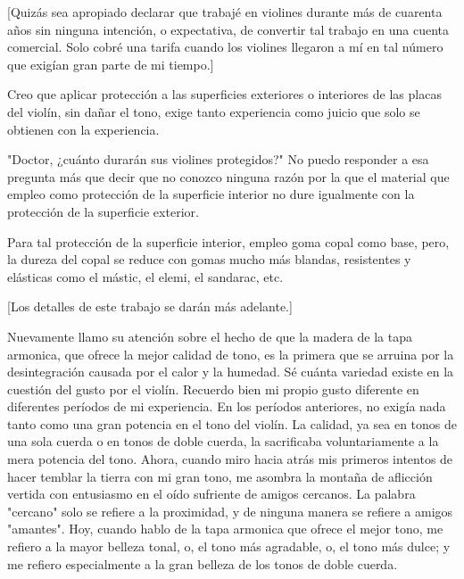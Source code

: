 \documentclass[12pt]{book}
\begin{document}
[Quizás sea apropiado declarar que trabajé en violines durante más de cuarenta años sin ninguna intención, o expectativa, de convertir tal trabajo en una cuenta comercial. Solo cobré una tarifa cuando los violines llegaron a mí en tal número que exigían gran parte de mi tiempo.]

Creo que aplicar protección a las superficies exteriores o interiores de las placas del violín, sin dañar el tono, exige tanto experiencia como juicio que solo se obtienen con la experiencia.

"Doctor, ¿cuánto durarán sus violines protegidos?" No puedo responder a esa pregunta más que decir que no conozco ninguna razón por la que el material que empleo como protección de la superficie interior no dure igualmente con la protección de la superficie exterior.

Para tal protección de la superficie interior, empleo goma copal como base, pero, la dureza del copal se reduce con gomas mucho más blandas, resistentes y elásticas como el mástic, el elemi, el sandarac, etc.

[Los detalles de este trabajo se darán más adelante.]

Nuevamente llamo su atención sobre el hecho de que la madera de la tapa armonica, que ofrece la mejor calidad de tono, es la primera que se arruina por la desintegración causada por el calor y la humedad. Sé cuánta variedad existe en la cuestión del gusto por el violín. Recuerdo bien mi propio gusto diferente en diferentes períodos de mi experiencia. En los períodos anteriores, no exigía nada tanto como una gran potencia en el tono del violín. La calidad, ya sea en tonos de una sola cuerda o en tonos de doble cuerda, la sacrificaba voluntariamente a la mera potencia del tono. Ahora, cuando miro hacia atrás mis primeros intentos de hacer temblar la tierra con mi gran tono, me asombra la montaña de aflicción vertida con entusiasmo en el oído sufriente de amigos cercanos. La palabra "cercano" solo se refiere a la proximidad, y de ninguna manera se refiere a amigos "amantes". Hoy, cuando hablo de la tapa armonica que ofrece el mejor tono, me refiero a la mayor belleza tonal, o, el tono más agradable, o, el tono más dulce; y me refiero especialmente a la gran belleza de los tonos de doble cuerda.
\end{document}
